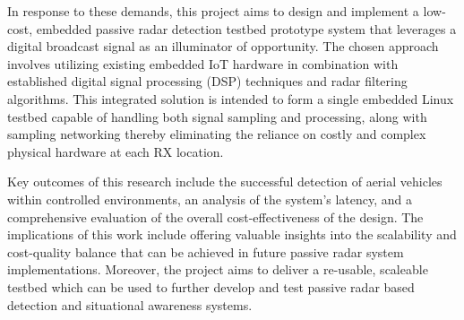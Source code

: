 In response to these demands, this project aims to design and implement a low-cost, embedded passive radar detection testbed prototype system that leverages a digital broadcast signal as an illuminator of opportunity. The chosen approach involves utilizing existing embedded IoT hardware in combination with established digital signal processing (DSP) techniques and radar filtering algorithms. This integrated solution is intended to form a single embedded Linux testbed capable of handling both signal sampling and processing, along with sampling networking thereby eliminating the reliance on costly and complex physical hardware at each RX location.

Key outcomes of this research include the successful detection of aerial vehicles within controlled environments, an analysis of the system's latency, and a comprehensive evaluation of the overall cost-effectiveness of the design. The implications of this work include offering valuable insights into the scalability and cost-quality balance that can be achieved in future passive radar system implementations. Moreover, the project aims to deliver a re-usable, scaleable testbed which can be used to further develop and test passive radar based detection and situational awareness systems.




